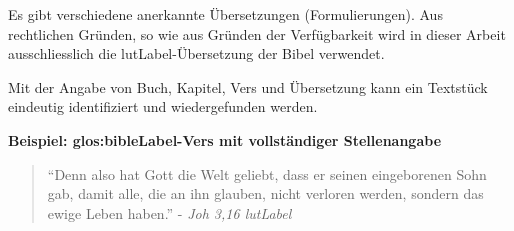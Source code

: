 Es gibt verschiedene anerkannte Übersetzungen (Formulierungen).
Aus rechtlichen Gründen, so wie aus Gründen der Verfügbarkeit wird in dieser Arbeit ausschliesslich die \gls{lutLabel}-Übersetzung der Bibel verwendet.

Mit der Angabe von Buch, Kapitel, Vers und Übersetzung kann ein Textstück eindeutig identifiziert und wiedergefunden werden.

\begin{framed}
	\textbf{Beispiel: \gls{glos:bibleLabel}-Vers mit vollständiger Stellenangabe}
	\begin{quote}
		"`Denn also hat Gott die Welt geliebt, dass er seinen eingeborenen Sohn gab, damit alle, die an ihn glauben, nicht verloren werden, sondern das ewige Leben haben."' - \textit{Joh 3,16 \gls{lutLabel}\footnotemark}
	\end{quote}
\end{framed}
